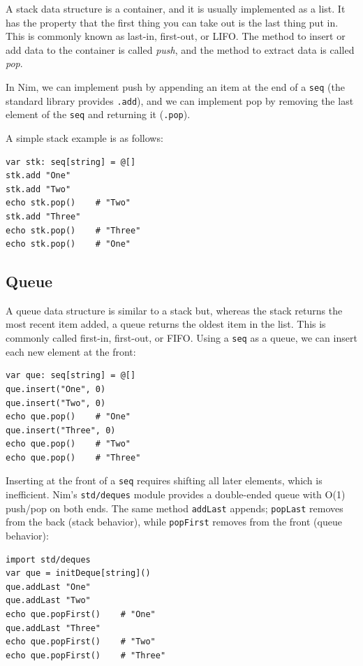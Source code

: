 \documentclass[justified, sixbynine]{tufte-book}
\def\ft{\small\tt}
\theoremstyle{plain}%
\newtheorem * {corollary}{Corollary}
\theoremstyle{definition}
\theoremstyle{remark}
\newtheorem * {remark}{Remark}
\newtheorem * {note}{Note}
\begin{document}
\begin{fullwidth}
A stack data structure is a container, and it is usually implemented as a list. It has the property that the first thing you can take out is the last thing put in. This is commonly known as last-in, first-out, or LIFO. The method to insert or add data to the container is called {\it push}, and the method to extract data is called {\it pop}.

In Nim, we can implement push by appending an item at the end of a {\ft seq} (the standard library provides {\ft .add}), and we can implement pop by removing the last element of the {\ft seq} and returning it ({\ft .pop}).

A simple stack example is as follows:

\begin{lstlisting}
var stk: seq[string] = @[]
stk.add "One"
stk.add "Two"
echo stk.pop()    # "Two"
stk.add "Three"
echo stk.pop()    # "Three"
echo stk.pop()    # "One"
\end{lstlisting}


\goodbreak\subsection{Queue}

A queue data structure is similar to a stack but, whereas the stack returns the most recent item added, a queue returns the oldest item in the list.  This is commonly called first-in, first-out, or FIFO.  Using a {\ft seq} as a queue, we can insert each new element at the front:

\begin{lstlisting}
var que: seq[string] = @[]
que.insert("One", 0)
que.insert("Two", 0)
echo que.pop()    # "One"
que.insert("Three", 0)
echo que.pop()    # "Two"
echo que.pop()    # "Three"
\end{lstlisting}

Inserting at the front of a {\ft seq} requires shifting all later elements, which is inefficient. Nim's {\ft std/deques} module provides a double-ended queue with O(1) push/pop on both ends. The same method {\ft addLast} appends; {\ft popLast} removes from the back (stack behavior), while {\ft popFirst} removes from the front (queue behavior):

\begin{lstlisting}
import std/deques
var que = initDeque[string]()
que.addLast "One"
que.addLast "Two"
echo que.popFirst()    # "One"
que.addLast "Three"
echo que.popFirst()    # "Two"
echo que.popFirst()    # "Three"
\end{lstlisting}



\end{fullwidth}
\end{document}

